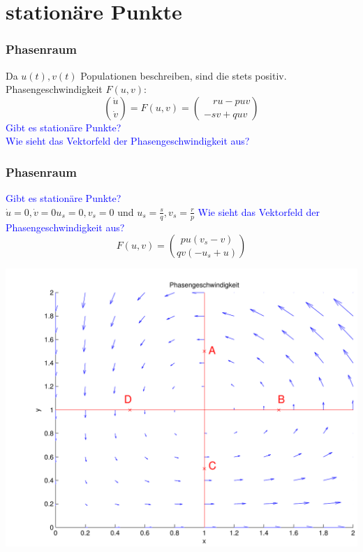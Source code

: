 \documentclass{beamer}
\begin{document}
\section{stationäre Punkte}
\frame
{
  \frametitle{Phasenraum}
Da $u(t), v(t)$ Populationen beschreiben, sind die stets positiv.\newline\newline
Phasengeschwindigkeit $F\left(u,v\right)$:
\begin{equation}
 \binom{\dot u}{\dot v} = F\left(u,v\right)= \binom{\phantom{-} r u - p u v}{- s v + q u v}\nonumber
\end{equation}\newline
\textcolor{blue} {Gibt es stationäre Punkte?}\\
\textcolor{blue} {Wie sieht das Vektorfeld der Phasengeschwindigkeit aus?}
}

\frame
{
  \frametitle{Phasenraum}
\textcolor{blue} {Gibt es stationäre Punkte?}\\
$\dot u=0,\dot v=0$\quad\quad$u_s= 0,v_s=0$ und $u_s= \frac{s}{q},v_s=\frac{r}{p}$\newline\newline
\textcolor{blue} {Wie sieht das Vektorfeld der Phasengeschwindigkeit aus?}
\begin{equation}
 F\left(u,v\right)= \binom{p u\left(v_s-v \right)}{q v\left(-u_s+u \right)}\nonumber
\end{equation}
\begin{center}
 \includegraphics[scale=0.3]{img/Vektorfeld-eps-converted-to.pdf}
 \end{center}
}
\end{document}
